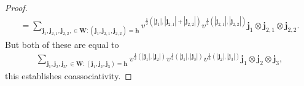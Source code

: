 \documentclass[pdftex]{sigma}
\numberwithin{equation}{section}
\begin{document}
\begin{proof}
\begin{gather*}
=\sum\limits_{\mathbf{j}_1,\mathbf{j}_{2,1},\mathbf{j}_{2,2},\in\mathbf{W}:(\mathbf{j}_1,\mathbf{j}_{2,1},\mathbf{j}_{2,2})=\mathbf{h}}
v^{\frac{1}{2}(|\mathbf{j}_1|,|\mathbf{j}_{2,1}|+|\mathbf{j}_{2,2}|)}v^{\frac{1}{2}(|\mathbf{j}_{2,1}|,|\mathbf{j}_{2,2}|)}
\mathbf{j}_1\otimes\mathbf{j}_{2,1}\otimes\mathbf{j}_{2,2}.
\end{gather*}
But both of these are equal to
\begin{gather*}
\sum\limits_{\mathbf{j}_1,\mathbf{j}_2,\mathbf{j}_3,\in\mathbf{W}:(\mathbf{j}_1,\mathbf{j}_2,\mathbf{j}_3)=\mathbf{h}}
v^{\frac{1}{2}(|\mathbf{j}_1|,|\mathbf{j}_2|)}v^{\frac{1}{2}(|\mathbf{j}_1|,|\mathbf{j}_3|)}
v^{\frac{1}{2}(|\mathbf{j}_2|,|\mathbf{j}_3|)}\mathbf{j}_1\otimes\mathbf{j}_2\otimes\mathbf{j}_3,
\end{gather*}
this establishes coassociativity.


\end{proof}
\end{document}

